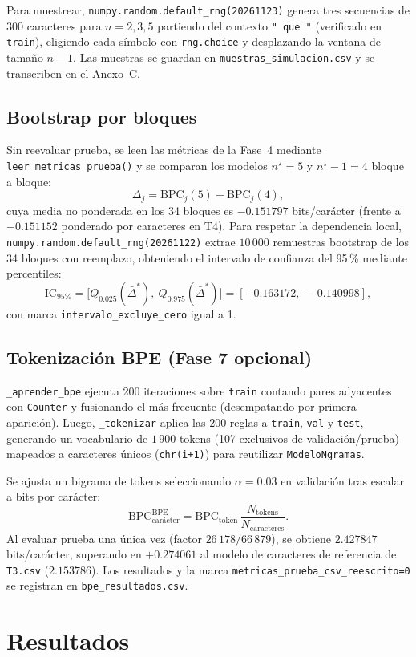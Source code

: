 \documentclass[11pt,letterpaper]{article}
\begin{document}
	Para muestrear, \texttt{numpy.random.default\_rng(20261123)} genera tres secuencias de 300 caracteres para $n=2,3,5$ partiendo del contexto \texttt{" que "} (verificado en \texttt{train}), eligiendo cada símbolo con \texttt{rng.choice} y desplazando la ventana de tamaño $n-1$. Las muestras se guardan en \texttt{muestras\_simulacion.csv} y se transcriben en el Anexo~C.
	
	\subsection{Bootstrap por bloques}
	Sin reevaluar prueba, se leen las métricas de la Fase~4 mediante \texttt{leer\_metricas\_prueba()} y se comparan los modelos $n^\star=5$ y $n^\star-1=4$ bloque a bloque:
	\begin{equation}
		\Delta_j=\mathrm{BPC}_j(5)-\mathrm{BPC}_j(4),
		\label{eq:delta_j}
	\end{equation}
	cuya media no ponderada en los 34 bloques es $-0.151797$ bits/carácter (frente a $-0.151152$ ponderado por caracteres en T4). Para respetar la dependencia local, \texttt{numpy.random.default\_rng(20261122)} extrae $10\,000$ remuestras bootstrap de los 34 bloques con reemplazo, obteniendo el intervalo de confianza del 95\,\% mediante percentiles:
	\begin{equation}
		\mathrm{IC}_{95\%}=
		\big[Q_{0.025}(\bar\Delta^*),\ Q_{0.975}(\bar\Delta^*)\big]
		=[-0.163172,\ -0.140998],
		\label{eq:ic95}
	\end{equation}
	con marca \texttt{intervalo\_excluye\_cero} igual a 1.
	
	\subsection{Tokenización BPE (Fase 7 opcional)}
	\texttt{\_aprender\_bpe} ejecuta 200 iteraciones sobre \texttt{train} contando pares adyacentes con \texttt{Counter} y fusionando el más frecuente (desempatando por primera aparición). Luego, \texttt{\_tokenizar} aplica las 200 reglas a \texttt{train}, \texttt{val} y \texttt{test}, generando un vocabulario de $1\,900$ tokens (107 exclusivos de validación/prueba) mapeados a caracteres únicos (\texttt{chr(i+1)}) para reutilizar \texttt{ModeloNgramas}.
	
	Se ajusta un bigrama de tokens seleccionando $\alpha=0.03$ en validación tras escalar a bits por carácter:
	\begin{equation}
		\mathrm{BPC}_{\text{carácter}}^{\text{BPE}}
		=\mathrm{BPC}_{\text{token}}\,
		\frac{N_{\text{tokens}}}{N_{\text{caracteres}}}.
		\label{eq:bpe_bpc}
	\end{equation}
	Al evaluar prueba una única vez (factor $26\,178/66\,879$), se obtiene $2.427847$ bits/carácter, superando en $+0.274061$ al modelo de caracteres de referencia de \texttt{T3.csv} ($2.153786$). Los resultados y la marca \texttt{metricas\_prueba\_csv\_reescrito=0} se registran en \texttt{bpe\_resultados.csv}.	\section{Resultados}
		
\end{document}
